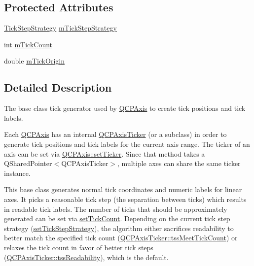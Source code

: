 \subsection*{Protected Attributes}
\begin{DoxyCompactItemize}
\item 
\mbox{\hyperlink{class_q_c_p_axis_ticker_ab6d2f9d9477821623ac9bc4b21ddf49a}{Tick\+Step\+Strategy}} \mbox{\hyperlink{class_q_c_p_axis_ticker_ac059d6d670b2f6132c593fb4de156701}{m\+Tick\+Step\+Strategy}}
\item 
int \mbox{\hyperlink{class_q_c_p_axis_ticker_a14a35b47d1aad11b08d18ea0e25937b8}{m\+Tick\+Count}}
\item 
double \mbox{\hyperlink{class_q_c_p_axis_ticker_a560ef9347b1aa599a9bf0e2f29d3ec16}{m\+Tick\+Origin}}
\end{DoxyCompactItemize}


\subsection{Detailed Description}
The base class tick generator used by \mbox{\hyperlink{class_q_c_p_axis}{Q\+C\+P\+Axis}} to create tick positions and tick labels. 

Each \mbox{\hyperlink{class_q_c_p_axis}{Q\+C\+P\+Axis}} has an internal \mbox{\hyperlink{class_q_c_p_axis_ticker}{Q\+C\+P\+Axis\+Ticker}} (or a subclass) in order to generate tick positions and tick labels for the current axis range. The ticker of an axis can be set via \mbox{\hyperlink{class_q_c_p_axis_a4ee03fcd2c74d05cd1a419b9af5cfbdc}{Q\+C\+P\+Axis\+::set\+Ticker}}. Since that method takes a {\ttfamily Q\+Shared\+Pointer$<$\+Q\+C\+P\+Axis\+Ticker$>$}, multiple axes can share the same ticker instance.

This base class generates normal tick coordinates and numeric labels for linear axes. It picks a reasonable tick step (the separation between ticks) which results in readable tick labels. The number of ticks that should be approximately generated can be set via \mbox{\hyperlink{class_q_c_p_axis_ticker_a47752abba8293e6dc18491501ae34008}{set\+Tick\+Count}}. Depending on the current tick step strategy (\mbox{\hyperlink{class_q_c_p_axis_ticker_a73b1d847c1a12159af6bfda4ebebe7d5}{set\+Tick\+Step\+Strategy}}), the algorithm either sacrifices readability to better match the specified tick count (\mbox{\hyperlink{class_q_c_p_axis_ticker_ab6d2f9d9477821623ac9bc4b21ddf49aa770312b6b9b0c64a37ceeba96e0cd7f2}{Q\+C\+P\+Axis\+Ticker\+::tss\+Meet\+Tick\+Count}}) or relaxes the tick count in favor of better tick steps (\mbox{\hyperlink{class_q_c_p_axis_ticker_ab6d2f9d9477821623ac9bc4b21ddf49aa9002aa2fd5633ab5556c71a26fed63a8}{Q\+C\+P\+Axis\+Ticker\+::tss\+Readability}}), which is the default.

